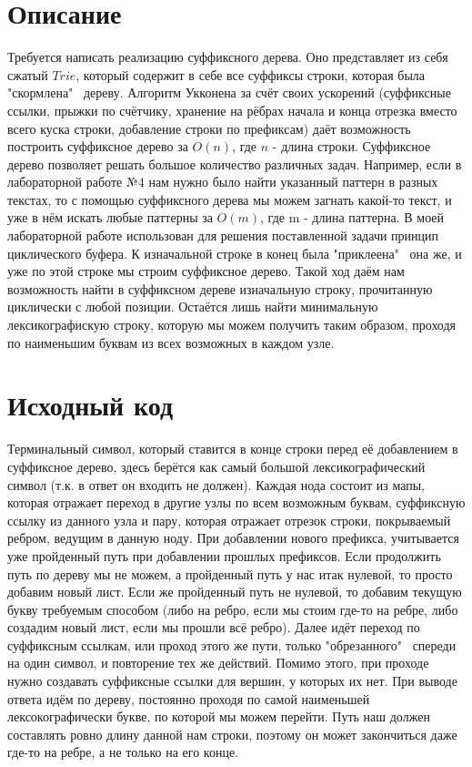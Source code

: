 \section{Описание}
Требуется написать реализацию суффиксного дерева. Оно представляет из себя сжатый $Trie$, который содержит в себе все суффиксы строки, которая была "скормлена" \ дереву. Алгоритм Укконена за счёт своих ускорений (суффиксные ссылки, прыжки по счётчику, хранение на рёбрах начала и конца отрезка вместо всего куска строки, добавление строки по префиксам) даёт возможность построить суффиксное дерево за $O(n)$, где $n$ - длина строки. Суффиксное дерево позволяет решать большое количество различных задач. Например, если в лабораторной работе №4 нам нужно было найти указанный паттерн в разных текстах, то с помощью суффиксного дерева мы можем загнать какой-то текст, и уже в нём искать любые паттерны за $O(m)$, где m - длина паттерна. В моей лабораторной работе использован для решения поставленной задачи принцип циклического буфера. К изначальной строке в конец была "приклеена" \ она же, и уже по этой строке мы строим суффиксное дерево. Такой ход даём нам возможность найти в суффиксном дереве изначальную строку, прочитанную циклически с любой позиции. Остаётся лишь найти минимальную лексикографискую строку, которую мы можем получить таким образом, проходя по наименьшим буквам из всех возможных в каждом узле.

\pagebreak

\section{Исходный код}
Терминальный символ, который ставится в конце строки перед её добавлением в суффиксное дерево, здесь берётся как самый большой лексикографический символ (т.к. в ответ он входить не должен). Каждая нода состоит из мапы, 
которая отражает переход в другие узлы по всем возможным буквам, суффиксную ссылку из данного узла и пару, которая отражает отрезок строки, покрываемый ребром, ведущим в данную ноду. При добавлении нового префикса, учитывается уже пройденный путь при добавлении прошлых префиксов. Если продолжить путь по дереву мы не можем, а пройденный путь у нас итак нулевой, то просто добавим новый лист. Если же пройденный путь не нулевой, то добавим текущую букву требуемым способом (либо на ребро, если мы стоим где-то на ребре, либо создадим новый лист, если мы прошли всё ребро). Далее идёт переход по суффиксным ссылкам, или проход этого же пути, только "обрезанного" \ спереди на один символ, и повторение тех же действий. Помимо этого, при проходе нужно создавать суффиксные ссылки для вершин, у которых их нет. При выводе ответа идём по дереву, постоянно проходя по самой наименьшей лексокографически букве, по которой мы можем перейти. Путь наш должен составлять ровно длину данной нам строки, поэтому он может закончиться даже где-то на ребре, а не только на его конце.

